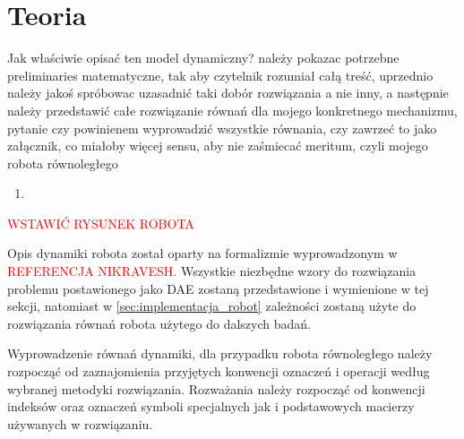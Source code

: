 \section{Teoria}

Jak właściwie opisać ten model dynamiczny?
należy pokazac potrzebne preliminaries matematyczne, tak aby czytelnik rozumiał całą treść, uprzednio należy jakoś spróbowac uzasadnić taki dobór rozwiązania a nie inny, a następnie należy przedstawić całe rozwiązanie równań dla mojego konkretnego mechanizmu, pytanie czy powinienem wyprowadzić wszystkie równania, czy zawrzeć to jako załącznik, co miałoby więcej sensu, aby nie zaśmiecać meritum, czyli mojego robota równoległego
\begin{enumerate}
    \item 
\end{enumerate}

\textcolor{red}{WSTAWIĆ RYSUNEK ROBOTA}
\label{sec:teoria_robot}

Opis dynamiki robota został oparty na formalizmie wyprowadzonym w \textcolor{red}{REFERENCJA NIKRAVESH}. Wszystkie niezbędne wzory do rozwiązania problemu postawionego jako \gls{DAE} zostaną przedstawione i wymienione w tej sekcji, natomiast w \ref{sec:implementacja_robot} zależności zostaną użyte do rozwiązania równań robota użytego do dalszych badań.

Wyprowadzenie równań dynamiki, dla przypadku robota równoległego należy rozpocząć od zaznajomienia przyjętych konwencji oznaczeń i operacji według wybranej metodyki rozwiązania. Rozważania należy rozpocząć od konwencji indeksów oraz oznaczeń symboli specjalnych jak i podstawowych macierzy używanych w rozwiązaniu.

